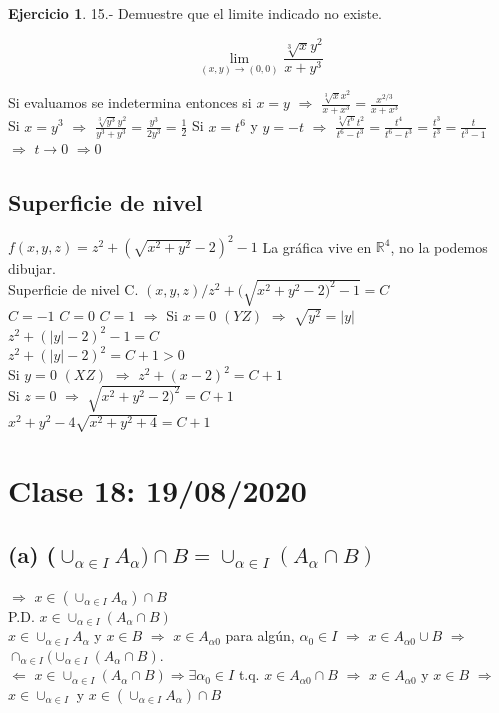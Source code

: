 \documentclass[secnumarabic,balancelastpage,amsmath,amssymb]{article}
\providecommand{\abs}[1]{\lvert#1\rvert}
\theoremstyle{remark}
\theoremstyle{definition}
\theoremstyle{prop}
\newtheorem{ejer}{Ejercicio}
\begin{document}
\begin{ejer}15.- Demuestre que el limite indicado no existe.

{\[
\lim_{(x,y) \to (0,0)} \frac{\sqrt[3]{x}y^{2}}{x+y^{3}}
   \]}
\end{ejer}
 Si evaluamos se indetermina entonces si $x=y$ $\Rightarrow$ $\frac{\sqrt[3]{x}x^{2}}{x+x^{3}}= \frac{x^{2/3}}{x+x^{3}}$ \\
Si $x=y^{3}$ $\Rightarrow$ $\frac{\sqrt[3]{y^{3}}y^{2}}{y^{3}+y^{3}}= \frac{y^{3}}{2y^{3}}=\frac{1}{2}$ Si $x=t^{6}$ y $y=-t$ $\Rightarrow$ $\frac{\sqrt[3]{t^{6}}t^{2}}{{t^{6}}-t^{3}}= \frac{t^{4}}{t^{6}-t^{3}}= \frac{t^{3}}{t^{3}}= \frac{t}{t^{3}-1}$ $\Rightarrow$ $t\rightarrow 0$ $\Rightarrow 0$\\

\subsection*{Superficie de nivel}
$f(x,y,z)= z^{2}+(\sqrt{x^{2}+y^{2}}-2)^{2}-1$
La gráfica vive en $\mathbb {R}^{4}$, no la podemos dibujar.\\
Superficie de nivel C.
$(x,y,z)/ z^{2}+(\sqrt{x^{2}+y^{2}-2)^{2}-1}=C$\\
$C=-1$    $C=0$     $C=1$ $\Rightarrow$ Si $x=0$ $(YZ)$ $\Rightarrow$ $\sqrt{y^{2}}= \abs{y}$ \\
$z^{2}+(\abs{y}-2)^{2}-1=C$\\
$z^{2}+(\abs{y}-2)^{2}=C+1>0$\\
 Si $y=0$ $(XZ)$ $\Rightarrow$ $z^{2}+(x-2)^{2}=C+1$\\
Si  $z=0$ $\Rightarrow$ $\sqrt{x^{2}+y^{2}-2)^{2}}=C+1$\\
$x^{2}+y^{2}-4\sqrt{x^{2}+y^{2}+4}=C+1$\\


\section{Clase 18: 19/08/2020}
\subsection*{(a) ($\cup_{\alpha \in I}A_{\alpha}) \cap B= \cup_{\alpha \in I}(A_{\alpha}\cap B)$}
$\Rightarrow$ $x \in (\cup_{\alpha \in I}A_{\alpha}) \cap B$\\
P.D. $x \in \cup_{\alpha \in I}(A_{\alpha}\cap B)$\\
$x \in \cup_{\alpha \in I} A_{\alpha}$ y $x \in B$ $\Rightarrow$ $x \in A_{\alpha 0}$ para algún, $\alpha_{0} \in I$ $\Rightarrow$ $x \in A_{\alpha 0} \cup B$ $\Rightarrow$ $\cap_{\alpha \in I}(\cup_{\alpha \in I} (A_{\alpha} \cap B).$\\
$\Leftarrow$ $x \in \cup_{\alpha \in I} (A_{\alpha}\cap B) \Rightarrow \exists \alpha_{0} \in I$ t.q. $x\in A_{\alpha 0}\cap B$
$\Rightarrow$ $x \in A_{\alpha 0}$ y $x\in B$ $\Rightarrow$ $x\in \cup_{\alpha \in I}$ y $x \in (\cup_{\alpha \in I} A_{\alpha}) \cap B$\\
\end{document}
